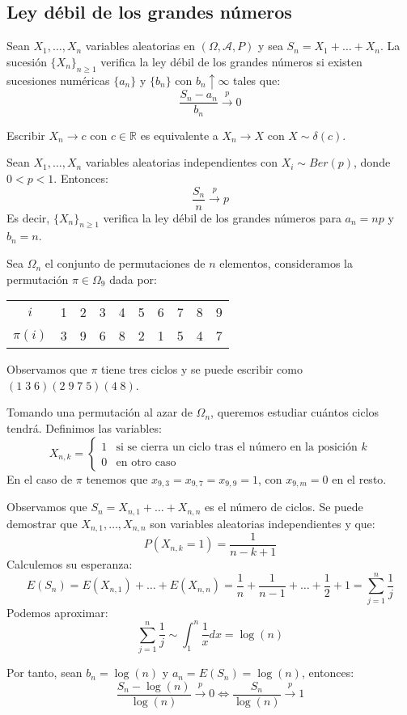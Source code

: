 \subsection*{Ley débil de los grandes números}
Sean $X_1, \dots, X_n$ variables aleatorias en $(\Omega, \mathcal{A}, P)$ y sea $S_n = X_1 + \dots + X_n$.
La sucesión $\{X_n\}_{n \geq 1}$ verifica la ley débil de los grandes números si existen sucesiones numéricas $\{a_n\}$ y $\{b_n\}$ con $b_n \uparrow \infty$ tales que:
$$\frac{S_n - a_n}{b_n} \xrightarrow{p} 0$$

\begin{note}
    Escribir $X_n \to c$ con $c \in \mathbb{R}$ es equivalente a $X_n \to X$ con $X \sim \delta(c)$.
\end{note}

\begin{theorem}[Bernoulli]
    Sean $X_1, \dots, X_n$ variables aleatorias independientes con $X_i \sim Ber(p)$, donde $0 < p < 1$.
    Entonces:
    $$\frac{S_n}{n} \xrightarrow{p} p$$
    Es decir, $\{X_n\}_{n \geq 1}$ verifica la ley débil de los grandes números para $a_n = np$ y $b_n = n$.
\end{theorem}

\begin{example}
    Sea $\Omega_n$ el conjunto de permutaciones de $n$ elementos, consideramos la permutación $\pi \in \Omega_9$ dada por:
    \begin{center}
        \begin{tabular}{ c | c c c c c c c c c}
            $i$      & 1 & 2 & 3 & 4 & 5 & 6 & 7 & 8 & 9 \\
            $\pi(i)$ & 3 & 9 & 6 & 8 & 2 & 1 & 5 & 4 & 7
        \end{tabular}
    \end{center}
    Observamos que $\pi$ tiene tres ciclos y se puede escribir como $(1 \; 3 \; 6)(2 \; 9 \; 7 \; 5)(4 \; 8)$.

    Tomando una permutación al azar de $\Omega_n$, queremos estudiar cuántos ciclos tendrá.
    Definimos las variables:
    $$X_{n, k} = \begin{cases}
            1 & \text{si se cierra un ciclo tras el número en la posición } k \\
            0 & \text{en otro caso}
        \end{cases}$$
    En el caso de $\pi$ tenemos que $x_{9, 3} = x_{9, 7} = x_{9, 9} = 1$, con $x_{9, m} = 0$ en el resto.

    Observamos que $S_n = X_{n, 1} + \dots + X_{n, n}$ es el número de ciclos.
    Se puede demostrar que $X_{n, 1}, \dots, X_{n, n}$ son variables aleatorias independientes y que:
    $$P(X_{n, k} = 1) = \frac{1}{n-k+1}$$
    Calculemos su esperanza:
    $$E(S_n) = E(X_{n, 1}) + \dots + E(X_{n, n}) = \frac{1}{n} + \frac{1}{n-1} + \dots + \frac{1}{2} + 1 = \sum_{j=1}^n \frac{1}{j}$$
    Podemos aproximar:
    $$\sum_{j=1}^n \frac{1}{j} \sim \int_1^n \frac{1}{x}dx = \log(n)$$

    Por tanto, sean $b_n = \log(n)$ y $a_n = E(S_n) = \log(n)$, entonces:
    $$\frac{S_n - \log(n)}{\log(n)} \xrightarrow{p} 0 \Leftrightarrow \frac{S_n}{\log(n)} \xrightarrow{p} 1$$
\end{example}


